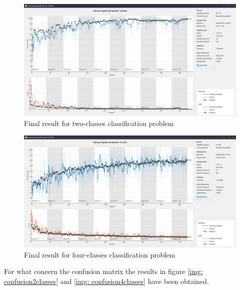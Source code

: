 \documentclass[a4paper]{report}
\begin{document}
	\begin{figure}[htbp]
		\centering
		\includegraphics[scale=0.31]{img/trainingCnnTwoClassesFinalResult.png}
		\caption{Final result for two-classes classification problem}
		\label{img: trainingCnnTwoClassesFinalResult}
	\end{figure}

	\begin{figure}[htbp]
		\centering
		\includegraphics[scale=0.31]{img/trainingCnnFourClassesFinalResult.png}
		\caption{Final result for four-classes classification problem}
		\label{img: trainingCnnFourClassesFinalResult}
	\end{figure}

	\noindent For what concern the confusion matrix the results in figure \ref{img: confusion2classes} and \ref{img: confusion4classes} have been obtained.
	
\end{document}
